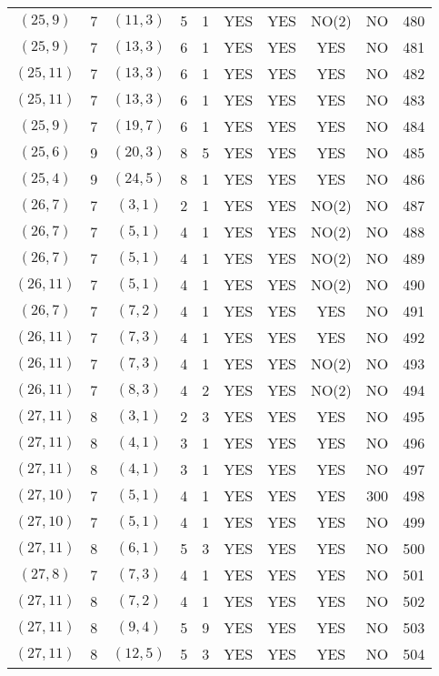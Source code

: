 \begin{longtable}{|c|c|c|c|c|c|c|c|c|c|}
$(25, 9)$ & 7 & $(11, 3)$ & 5 & 1 & YES & YES & NO(2) & NO & 480\\
$(25, 9)$ & 7 & $(13, 3)$ & 6 & 1 & YES & YES & YES & NO & 481\\
$(25, 11)$ & 7 & $(13, 3)$ & 6 & 1 & YES & YES & YES & NO & 482\\
$(25, 11)$ & 7 & $(13, 3)$ & 6 & 1 & YES & YES & YES & NO & 483\\
$(25, 9)$ & 7 & $(19, 7)$ & 6 & 1 & YES & YES & YES & NO & 484\\
$(25, 6)$ & 9 & $(20, 3)$ & 8 & 5 & YES & YES & YES & NO & 485\\
$(25, 4)$ & 9 & $(24, 5)$ & 8 & 1 & YES & YES & YES & NO & 486\\
$(26, 7)$ & 7 & $(3, 1)$ & 2 & 1 & YES & YES & NO(2) & NO & 487\\
$(26, 7)$ & 7 & $(5, 1)$ & 4 & 1 & YES & YES & NO(2) & NO & 488\\
$(26, 7)$ & 7 & $(5, 1)$ & 4 & 1 & YES & YES & NO(2) & NO & 489\\
$(26, 11)$ & 7 & $(5, 1)$ & 4 & 1 & YES & YES & NO(2) & NO & 490\\
$(26, 7)$ & 7 & $(7, 2)$ & 4 & 1 & YES & YES & YES & NO & 491\\
$(26, 11)$ & 7 & $(7, 3)$ & 4 & 1 & YES & YES & YES & NO & 492\\
$(26, 11)$ & 7 & $(7, 3)$ & 4 & 1 & YES & YES & NO(2) & NO & 493\\
$(26, 11)$ & 7 & $(8, 3)$ & 4 & 2 & YES & YES & NO(2) & NO & 494\\
$(27, 11)$ & 8 & $(3, 1)$ & 2 & 3 & YES & YES & YES & NO & 495\\
$(27, 11)$ & 8 & $(4, 1)$ & 3 & 1 & YES & YES & YES & NO & 496\\
$(27, 11)$ & 8 & $(4, 1)$ & 3 & 1 & YES & YES & YES & NO & 497\\
$(27, 10)$ & 7 & $(5, 1)$ & 4 & 1 & YES & YES & YES & 300 & 498\\
$(27, 10)$ & 7 & $(5, 1)$ & 4 & 1 & YES & YES & YES & NO & 499\\
$(27, 11)$ & 8 & $(6, 1)$ & 5 & 3 & YES & YES & YES & NO & 500\\
$(27, 8)$ & 7 & $(7, 3)$ & 4 & 1 & YES & YES & YES & NO & 501\\
$(27, 11)$ & 8 & $(7, 2)$ & 4 & 1 & YES & YES & YES & NO & 502\\
$(27, 11)$ & 8 & $(9, 4)$ & 5 & 9 & YES & YES & YES & NO & 503\\
$(27, 11)$ & 8 & $(12, 5)$ & 5 & 3 & YES & YES & YES & NO & 504\\

\end{longtable}
